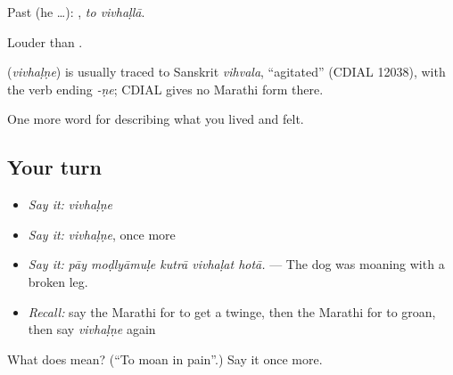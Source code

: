 Past (he …):  , \emph{to vivhaḷlā}.

Louder than .

\begin{cousinweb}
\textbf{} (\emph{vivhaḷṇe}) is usually traced to Sanskrit \emph{vihvala}, \textquotedblleft{}agitated\textquotedblright{} (CDIAL 12038), with the verb ending \emph{-ṇe}; CDIAL gives no Marathi form there.
\end{cousinweb}

\begin{grammarlens}[title={What you've built}]
One more word for describing what you lived and felt.
\end{grammarlens}

\subsection*{Your turn}
\begin{itemize}
\raggedright
  \item \emph{Say it:} \emph{vivhaḷṇe}
  \item \emph{Say it:} \emph{vivhaḷṇe}, once more
  \item \emph{Say it:} \emph{pāy moḍlyāmuḷe kutrā vivhaḷat hotā.} — The dog was moaning with a broken leg.
  \item \emph{Recall:} say the Marathi for to get a twinge, then the Marathi for to groan, then say \emph{vivhaḷṇe} again
\end{itemize}

\begin{tcolorbox}[breakable,colback=teal!4,colframe=teal!35!black,title={Before you move on}]
What does  mean? (\textquotedblleft{}To moan in pain\textquotedblright{}.) Say it once more.
\end{tcolorbox}
